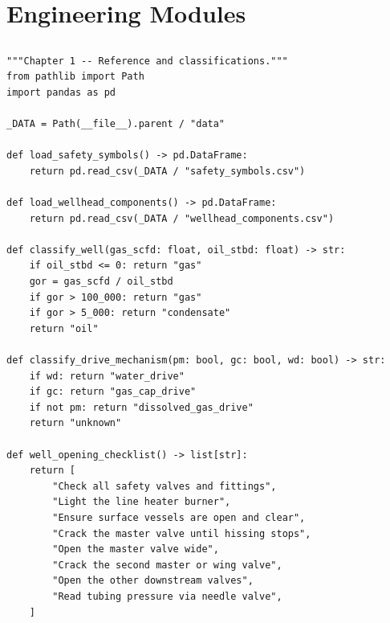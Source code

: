 \documentclass[10pt,a4paper,openany]{book}
\begin{document}
\part{Engineering Modules}

\chapter{}
\begin{lstlisting}
"""Chapter 1 -- Reference and classifications."""
from pathlib import Path
import pandas as pd

_DATA = Path(__file__).parent / "data"

def load_safety_symbols() -> pd.DataFrame:
    return pd.read_csv(_DATA / "safety_symbols.csv")

def load_wellhead_components() -> pd.DataFrame:
    return pd.read_csv(_DATA / "wellhead_components.csv")

def classify_well(gas_scfd: float, oil_stbd: float) -> str:
    if oil_stbd <= 0: return "gas"
    gor = gas_scfd / oil_stbd
    if gor > 100_000: return "gas"
    if gor > 5_000: return "condensate"
    return "oil"

def classify_drive_mechanism(pm: bool, gc: bool, wd: bool) -> str:
    if wd: return "water_drive"
    if gc: return "gas_cap_drive"
    if not pm: return "dissolved_gas_drive"
    return "unknown"

def well_opening_checklist() -> list[str]:
    return [
        "Check all safety valves and fittings",
        "Light the line heater burner",
        "Ensure surface vessels are open and clear",
        "Crack the master valve until hissing stops",
        "Open the master valve wide",
        "Crack the second master or wing valve",
        "Open the other downstream valves",
        "Read tubing pressure via needle valve",
    ]
\end{lstlisting}
\end{document}
